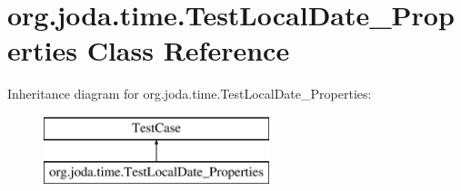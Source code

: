 \hypertarget{classorg_1_1joda_1_1time_1_1_test_local_date___properties}{\section{org.\-joda.\-time.\-Test\-Local\-Date\-\_\-\-Properties Class Reference}
\label{classorg_1_1joda_1_1time_1_1_test_local_date___properties}
}
Inheritance diagram for org.\-joda.\-time.\-Test\-Local\-Date\-\_\-\-Properties\-:\begin{figure}[H]
\begin{center}
\leavevmode
\includegraphics[height=2.000000cm]{classorg_1_1joda_1_1time_1_1_test_local_date___properties}
\end{center}
\end{figure}

